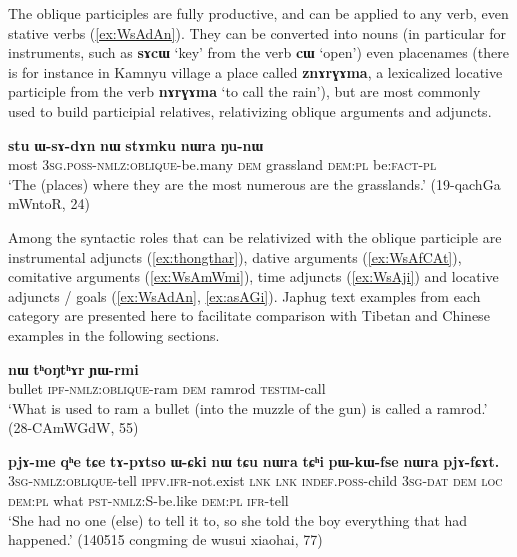 \documentclass[oneside,a4paper,11pt]{article}
\newcommand{\ipa}[1]{\textbf{{\phon\mbox{#1}}}} %
\begin{document}
The oblique participles are fully productive, and can be applied to any verb, even stative verbs (\ref{ex:WsAdAn}). They can be converted into nouns (in particular for instruments, such as \ipa{sɤcɯ} `key' from the verb \ipa{cɯ} `open') even placenames (there is for instance in Kamnyu village a place called \ipa{znɤrɣɤma}, a lexicalized locative participle from the verb \ipa{nɤrɣɤma} `to call the rain'), but are most commonly used to build participial relatives, relativizing oblique arguments and adjuncts.

\begin{exe}
\ex \label{ex:WsAdAn}
\gll \ipa{stu} 	\ipa{ɯ-sɤ-dɤn} 	\ipa{nɯ} 	\ipa{stɤmku} 	\ipa{nɯra} 	\ipa{ŋu-nɯ}  \\
most \textsc{3sg}.\textsc{poss}-\textsc{nmlz}:\textsc{oblique}-be.many \textsc{dem} grassland \textsc{dem}:\textsc{pl} be:\textsc{fact}-\textsc{pl} \\
\glt `The (places) where they are the most numerous are the grasslands.' (19-qachGa mWntoR, 24)
\end{exe}

Among the syntactic roles that can be relativized with the oblique participle are instrumental adjuncts (\ref{ex:thongthar}), dative arguments (\ref{ex:WsAfCAt}), comitative arguments (\ref{ex:WsAmWmi}), time adjuncts (\ref{ex:WsAji}) and locative adjuncts / goals (\ref{ex:WsAdAn}, \ref{ex:asAGi}). Japhug text examples from each category are presented here to facilitate comparison with Tibetan and Chinese examples in the following sections.

 \begin{exe}
\ex \label{ex:thongthar}
\gll [\ipa{qandʑi}   	\ipa{cʰɯ-sɤ-ɣnda}]   	\ipa{nɯ}   	\ipa{tʰoŋtʰɤr}   	  	\ipa{ɲɯ-rmi}    \\
bullet \textsc{ipf}-\textsc{nmlz:oblique}-ram   \textsc{dem} ramrod \textsc{testim}-call \\
 \glt `What is used to ram a bullet (into the muzzle of the gun) is called a ramrod.' (28-CAmWGdW, 55)
 \end{exe}
 
 \begin{exe}
\ex \label{ex:WsAfCAt}
\gll
[\ipa{ɯ-sɤ-fɕɤt}] \ipa{pjɤ-me} 	\ipa{qʰe} 	\ipa{tɕe} 	\ipa{tɤ-pɤtso} 	\ipa{ɯ-ɕki} 	\ipa{nɯ} 	\ipa{tɕu} 	\ipa{nɯra} 	\ipa{tɕʰi} 	\ipa{pɯ-kɯ-fse} 	\ipa{nɯra} 	\ipa{pjɤ-fɕɤt.} \\
\textsc{3sg-nmlz:oblique}-tell \textsc{ipfv.ifr}-not.exist \textsc{lnk} \textsc{lnk} \textsc{indef.poss}-child \textsc{3sg-dat} \textsc{dem} \textsc{loc} \textsc{dem:pl} what \textsc{pst-nmlz:S}-be.like  \textsc{dem:pl} \textsc{ifr}-tell \\
\glt `She had no one (else) to tell it to, so she told the boy everything that had happened.' (140515 congming de wusui xiaohai, 77)
\end{exe} 
\end{document}
